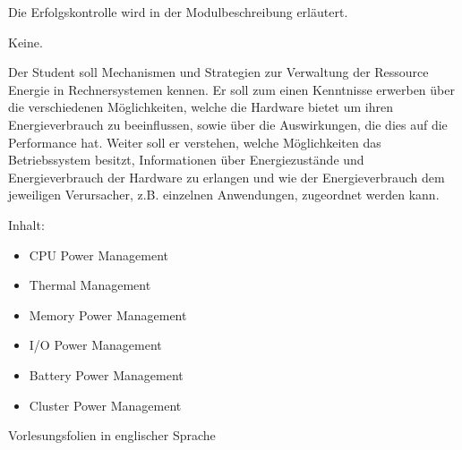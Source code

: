 \begin{course}

\setdoclanguagegerman
{}



\coursehead


\label{cour_6229.dp_997}


\begin{styleenv}
\begin{assessment}
Die Erfolgskontrolle wird in der Modulbeschreibung erläutert.


\end{assessment}

\begin{conditions}Keine.\end{conditions}


\end{styleenv}

\begin{learningoutcomes}
Der Student soll Mechanismen und Strategien zur Verwaltung der Ressource Energie in Rechnersystemen kennen. Er soll zum einen Kenntnisse erwerben über die verschiedenen Möglichkeiten, welche die Hardware bietet um ihren Energieverbrauch zu beeinflussen, sowie über die Auswirkungen, die dies auf die Performance hat. Weiter soll er verstehen, welche Möglichkeiten das Betriebssystem besitzt, Informationen über Energiezustände und Energieverbrauch der Hardware zu erlangen und wie der Energieverbrauch dem jeweiligen Verursacher, z.B. einzelnen Anwendungen, zugeordnet werden kann.


\end{learningoutcomes}

\begin{content}
Inhalt:

 \begin{itemize}\item CPU Power Management  \item Thermal Management  \item Memory Power Management  \item I/O Power Management  \item Battery Power Management  \item Cluster Power Management  \end{itemize}
\end{content}

\begin{media}Vorlesungsfolien in englischer Sprache

\end{media}





\end{course}